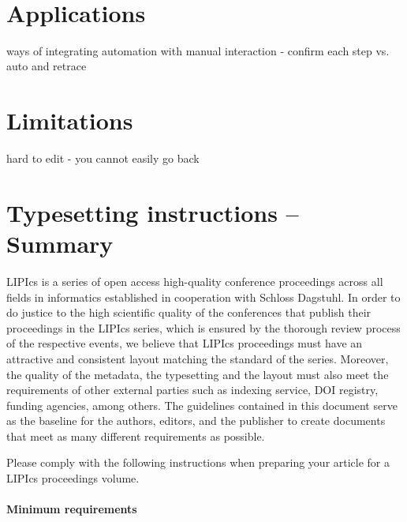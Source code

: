 \documentclass[a4paper,UKenglish,cleveref, autoref, thm-restate]{lipics-v2021}
\begin{document}
~

\section{Applications}
\label{sec:applications}

ways of integrating automation with manual interaction
- confirm each step vs. auto and retrace

\cite{rein-2019-exploratory}

\cite{verter-2024-mixed}

\section{Limitations}

hard to edit - you cannot easily go back

\newpage



\newpage

\section{Typesetting instructions -- Summary}
\label{sec:typesetting-summary}

LIPIcs is a series of open access high-quality conference proceedings across all fields in informatics established in cooperation with Schloss Dagstuhl.
In order to do justice to the high scientific quality of the conferences that publish their proceedings in the LIPIcs series, which is ensured by the thorough review process of the respective events, we believe that LIPIcs proceedings must have an attractive and consistent layout matching the standard of the series.
Moreover, the quality of the metadata, the typesetting and the layout must also meet the requirements of other external parties such as indexing service, DOI registry, funding agencies, among others. The guidelines contained in this document serve as the baseline for the authors, editors, and the publisher to create documents that meet as many different requirements as possible.

Please comply with the following instructions when preparing your article for a LIPIcs proceedings volume.
\paragraph*{Minimum requirements}
\end{document}
